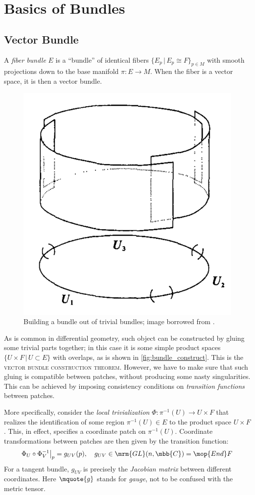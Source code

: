 \documentclass[a4paper,11pt]{article}
\begin{document}
\section{Basics of Bundles}
\subsection{Vector Bundle}
	A \textit{fiber bundle} $E$ is a ``bundle'' of identical fibers $\{E_p \,|\, E_p\cong F\}_{p\in M}$ with smooth projections down to the base manifold $\pi\colon E\to M$. When the fiber is a vector space, it is then a vector bundle. 
	
	\begin{figure}[!ht]
	\centering
	\includegraphics[width=.3\linewidth]{img/bundle_construct.png}
	\caption{Building a bundle out of trivial bundles; image borrowed from \cite{baez1994gauge}. }
	\label{fig:bundle_construct}
	\end{figure}
	
	As is common in differential geometry, such object can be constructed by gluing some trivial parts together; in this case it is some simple product spaces $\{U \times F \,|\, U \subset E\}$ with overlaps, as is shown in \autoref{fig:bundle_construct}. This is the \textsc{vector bundle construction theorem}. However, we have to make sure that such gluing is compatible between patches, without producing some nasty singularities. This can be achieved by imposing consistency conditions on \textit{transition functions} \cite{baez1994gauge,Nakahara:2003nw} between patches. 
	
	More specifically, consider the \textit{local trivialization} $\Phi\colon \pi^{-1}(U)\to U\times F$ that realizes the identification of some region $\pi^{-1}(U)\in E$ to the product space $U \times F$. This, in effect, specifies a coordinate patch on $\pi^{-1}(U)$. Coordinate transformations between patches are then given by the transition function:
	\begin{equation}
		\Phi_U\circ\Phi_V^{\smash{-1}}
			\big|_p
		= g_{UV} (p),\quad
		g_{UV}
		\in \mrm{GL}(n,\mbb{C})
		= \mop{End} F
	\end{equation}
	For a tangent bundle, $g_{UV}$ is precisely the \textit{Jacobian matrix} between different coordinates. Here $\mquote{g}$ stands for \textit{gauge}, not to be confused with the metric tensor. 
	
\end{document}
